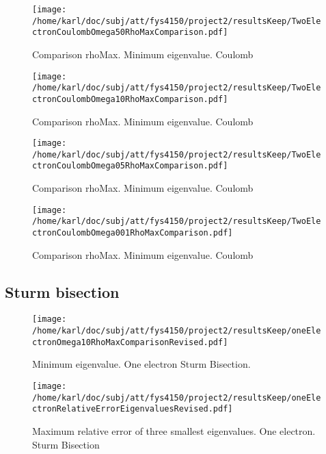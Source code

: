 \documentclass{article}
\begin{document}
\begin{minipage}{.49\textwidth} %
	\begin{figure}[H]
		\centering
		\texttt{[image: /home/karl/doc/subj/att/fys4150/project2/resultsKeep/TwoElectronCoulombOmega50RhoMaxComparison.pdf]}
		\caption{Comparison rhoMax. Minimum eigenvalue. Coulomb}
		\label{1}
	\end{figure}
\end{minipage}\hfill
\begin{minipage}{.49\textwidth}
	\begin{figure}[H]
		\centering
		\texttt{[image: /home/karl/doc/subj/att/fys4150/project2/resultsKeep/TwoElectronCoulombOmega10RhoMaxComparison.pdf]}
		\caption{Comparison rhoMax. Minimum eigenvalue. Coulomb}
		\label{1}
	\end{figure}
\end{minipage}\hfill
\begin{minipage}{.49\textwidth}
	\begin{figure}[H]
		\centering
		\texttt{[image: /home/karl/doc/subj/att/fys4150/project2/resultsKeep/TwoElectronCoulombOmega05RhoMaxComparison.pdf]}
		\caption{Comparison rhoMax. Minimum eigenvalue. Coulomb}
		\label{1}
	\end{figure}
\end{minipage}\hfill
\begin{minipage}{.49\textwidth}
	\begin{figure}[H]
		\centering
		\texttt{[image: /home/karl/doc/subj/att/fys4150/project2/resultsKeep/TwoElectronCoulombOmega001RhoMaxComparison.pdf]}
		\caption{Comparison rhoMax. Minimum eigenvalue. Coulomb}
		\label{1}
	\end{figure}
\end{minipage}\hfill

\subsection{Sturm bisection}

\begin{minipage}{.49\textwidth} %
	\begin{figure}[H]
		\centering
		\texttt{[image: /home/karl/doc/subj/att/fys4150/project2/resultsKeep/oneElectronOmega10RhoMaxComparisonRevised.pdf]}
		\caption{Minimum eigenvalue. One electron Sturm Bisection.}
		\label{1}
	\end{figure}
\end{minipage}\hfill
\begin{minipage}{.49\textwidth}
	\begin{figure}[H]
		\centering
		\texttt{[image: /home/karl/doc/subj/att/fys4150/project2/resultsKeep/oneElectronRelativeErrorEigenvaluesRevised.pdf]}
		\caption{Maximum relative error of three smallest eigenvalues. One electron. Sturm Bisection}
		\label{1}
	\end{figure}
\end{minipage}\hfill
\end{document}

